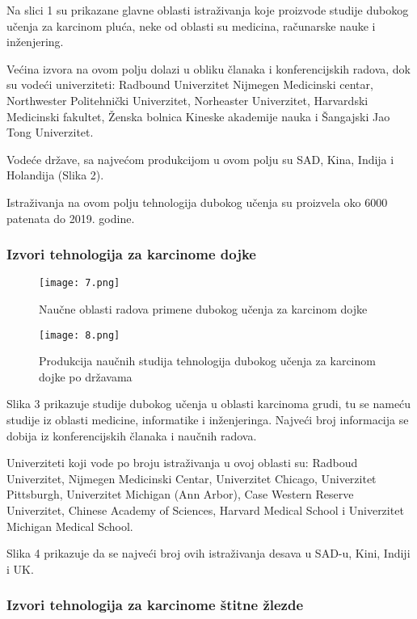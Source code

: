 \documentclass[a4paper]{article}
\begin{document}
Na slici 1 su prikazane glavne oblasti istraživanja koje proizvode studije dubokog učenja za karcinom pluća, neke od oblasti su medicina, računarske nauke i inženjering.

Većina izvora na ovom polju dolazi u obliku članaka i konferencijskih radova, dok su vodeći univerziteti: Radbound Univerzitet Nijmegen Medicinski centar, Northwester Politehnički Univerzitet, Norheaster Univerzitet, Harvardski Medicinski fakultet, Ženska bolnica Kineske akademije nauka i Šangajski Jao Tong Univerzitet.

Vodeće države, sa najvećom produkcijom u ovom polju su SAD, Kina, Indija i Holandija (Slika 2).

Istraživanja na ovom polju tehnologija dubokog učenja su proizvela oko 6000 patenata do 2019. godine.


\FloatBarrier
\subsubsection{Izvori tehnologija za karcinome dojke}
\label{subsec:ppnaslov3}


\begin{figure}[hbt!]
\centering
\texttt{[image: 7.png]}
\caption{Naučne oblasti radova primene dubokog učenja za karcinom dojke}
\end{figure}

\begin{figure}[hbt!]
\centering
\texttt{[image: 8.png]}
\caption{Produkcija naučnih studija tehnologija dubokog učenja za karcinom dojke po državama}
\end{figure}


Slika 3 prikazuje studije dubokog učenja u oblasti karcinoma grudi, tu se nameću studije iz oblasti medicine, informatike i inženjeringa.
Najveći broj informacija se dobija iz konferencijskih članaka i naučnih radova.

Univerziteti koji vode po broju istraživanja u ovoj oblasti su: Radboud Univerzitet, Nijmegen Medicinski Centar, Univerzitet Chicago, Univerzitet Pittsburgh,
Univerzitet Michigan (Ann Arbor), Case Western Reserve Univerzitet, Chinese Academy of Sciences,
Harvard Medical School i Univerzitet Michigan Medical School.

Slika 4 prikazuje da se najveći broj ovih istraživanja desava u SAD-u, Kini, Indiji i UK.


\FloatBarrier
\subsubsection{Izvori tehnologija za karcinome štitne žlezde}
\label{subsec:ppnaslov4}
\end{document}
